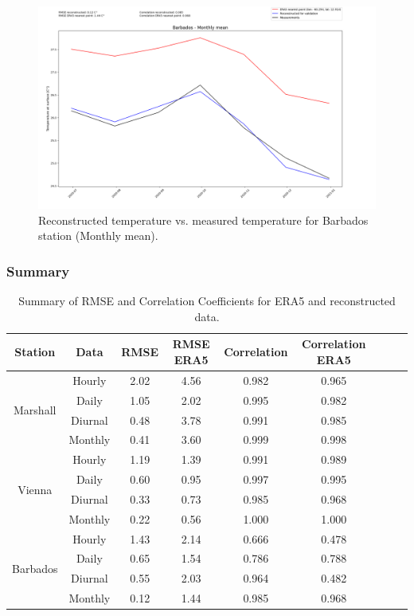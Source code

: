 \begin{figure}
    \centering
    \includegraphics[width=1.00\textwidth]{resources/images/charts/barbados_eval_grib_final/Barbados - Monthly mean.png}
    \caption{Reconstructed temperature vs. measured temperature for Barbados station (Monthly mean).}
\end{figure}

\subsubsection*{Summary}

\begin{table}
\centering
\begin{tabular}{|c|c|c|c|c|c|c|c|c|}
\hline
Station & Data & RMSE & RMSE ERA5 & Correlation & Correlation ERA5 \\
\hline
\multirow{4}{*}{Marshall} & Hourly & 2.02 & 4.56 & 0.982 & 0.965 \\
& Daily & 1.05 & 2.02 & 0.995 & 0.982 \\
& Diurnal & 0.48 & 3.78 & 0.991 & 0.985 \\
& Monthly & 0.41 & 3.60 & 0.999 & 0.998 \\
\hline
\multirow{4}{*}{Vienna} & Hourly & 1.19 & 1.39 & 0.991 & 0.989 \\
& Daily & 0.60 & 0.95 & 0.997 & 0.995 \\
& Diurnal & 0.33 & 0.73 & 0.985 & 0.968 \\
& Monthly & 0.22 & 0.56 & 1.000 & 1.000 \\
\hline
\multirow{4}{*}{Barbados} & Hourly & 1.43 & 2.14 & 0.666 & 0.478 \\
& Daily & 0.65 & 1.54 & 0.786 & 0.788 \\
& Diurnal & 0.55 & 2.03 & 0.964 & 0.482 \\
& Monthly & 0.12 & 1.44 & 0.985 & 0.968 \\
\hline
\end{tabular}
\caption{Summary of RMSE and Correlation Coefficients for ERA5 and reconstructed data.}
\label{tab:results_summary}
\end{table}


